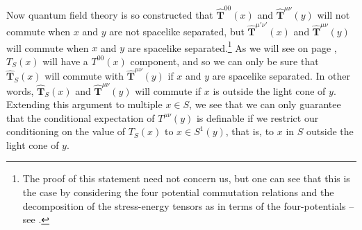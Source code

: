 Now quantum field theory is so constructed that $\hat{\bm{T}}^{{00}}(x)$ and $\hat{\bm{T}}^{{\mu\nu}}(y)$ will not commute when $x$ and $y$ are not spacelike separated, but $\hat{\bm{T}}^{{\mu'\nu'}}(x)$ and $\hat{\bm{T}}^{{\mu\nu}}(y)$ will commute when $x$ and $y$ are spacelike separated.\footnote{The proof of this statement need not concern us, but one can see that this is the case by considering the four potential commutation relations and the decomposition of the stress-energy tensors as in terms of the four-potentials  -- see \cite[p. 1443--1444]{SchwingerJulianI}.} As we will see on page \pageref{TSdef}, $T_S(x)$ will have a $T^{00}(x)$ component, and so we can only be sure that $\hat{\bm{T}}_S(x)$ will commute with  $\hat{\bm{T}}^{{\mu\nu}}(y)$ if $x$ and $y$ are spacelike separated. In other words, $\hat{\bm{T}}_S(x)$ and $\hat{\bm{T}}^{{\mu\nu}}(y)$ will commute if $x$ is outside the light cone of $y$. Extending this argument to multiple $x\in S$, we see that we can only guarantee that the conditional expectation of $T^{\mu\nu}(y)$ is definable if we restrict our conditioning on the value of $T_S(x)$ to $x\in S^1(y)$, that is, to $x$ in $S$ outside the light cone of $y$.

